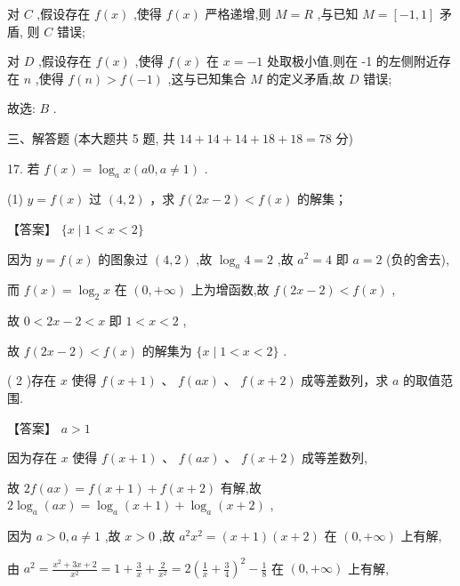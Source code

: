\documentclass[10pt]{article}
\begin{document}
对 \(C\) ,假设存在 \(f\left( x\right)\) ,使得 \(f\left( x\right)\) 严格递增,则 \(M = R\) ,与已知 \(M = \left\lbrack  {-1,1}\right\rbrack\) 矛盾, 则 \(C\) 错误;

对 \(D\) ,假设存在 \(f\left( x\right)\) ,使得 \(f\left( x\right)\) 在 \(x =  - 1\) 处取极小值,则在 -1 的左侧附近存在 \(n\) ,使得 \(f\left( n\right)  > f\left( {-1}\right)\) ,这与已知集合 \(M\) 的定义矛盾,故 \(D\) 错误;

故选: \(B\) .

三、解答题 (本大题共 5 题, 共 \({14} + {14} + {14} + {18} + {18} = {78}\) 分)

17. 若 \(f\left( x\right)  = {\log }_{a}x\left( {{a0},a \neq  1}\right)\) .

(1) \(y = f\left( x\right)\) 过 \(\left( {4,2}\right)\) ，求 \(f\left( {{2x} - 2}\right)  < f\left( x\right)\) 的解集；

【答案】 \(\{ x \mid  1 < x < 2\}\)

因为 \(y = f\left( x\right)\) 的图象过 \(\left( {4,2}\right)\) ,故 \({\log }_{a}4 = 2\) ,故 \({a}^{2} = 4\) 即 \(a = 2\) (负的舍去),

而 \(f\left( x\right)  = {\log }_{2}x\) 在 \(\left( {0, + \infty }\right)\) 上为增函数,故 \(f\left( {{2x} - 2}\right)  < f\left( x\right)\) ,

故 \(0 < {2x} - 2 < x\) 即 \(1 < x < 2\) ,

故 \(f\left( {{2x} - 2}\right)  < f\left( x\right)\) 的解集为 \(\{ x \mid  1 < x < 2\}\) .

( 2 )存在 \(x\) 使得 \(f\left( {x + 1}\right)\) 、 \(f\left( {ax}\right)\) 、 \(f\left( {x + 2}\right)\) 成等差数列，求 \(a\) 的取值范围.

【答案】 \(a > 1\)

因为存在 \(x\) 使得 \(f\left( {x + 1}\right) \text{ 、 }f\left( {ax}\right) \text{ 、 }f\left( {x + 2}\right)\) 成等差数列,

故 \({2f}\left( {ax}\right)  = f\left( {x + 1}\right)  + f\left( {x + 2}\right)\) 有解,故 \(2{\log }_{a}\left( {ax}\right)  = {\log }_{a}\left( {x + 1}\right)  + {\log }_{a}\left( {x + 2}\right)\) ,

因为 \(a > 0,a \neq  1\) ,故 \(x > 0\) ,故 \({a}^{2}{x}^{2} = \left( {x + 1}\right) \left( {x + 2}\right)\) 在 \(\left( {0, + \infty }\right)\) 上有解,

由 \({a}^{2} = \frac{{x}^{2} + {3x} + 2}{{x}^{2}} = 1 + \frac{3}{x} + \frac{2}{{x}^{2}} = 2{\left( \frac{1}{x} + \frac{3}{4}\right) }^{2} - \frac{1}{8}\) 在 \(\left( {0, + \infty }\right)\) 上有解,
\end{document}
